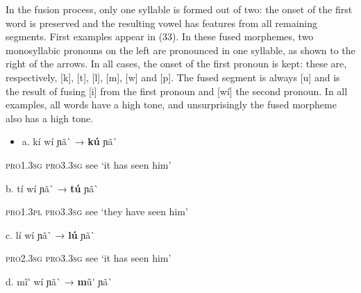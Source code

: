 In the fusion process, only one syllable is formed out of two: the onset of the first word is preserved and the resulting vowel has features from all remaining segments. First examples appear in (33). In these fused morphemes, two monosyllabic pronouns on the left are pronounced in one syllable, as shown to the right of the arrows. In all cases, the onset of the first pronoun is kept: these are, respectively, [k], [t], [l], [m], [w] and [p]. The fused segment is always [u] and is the result of fusing [i] from the first pronoun and [wí] the second pronoun. In all examples, all words have a high tone, and unsurprisingly the fused morpheme also has a high tone.

\begin{itemize}
\item \begin{styleindexi}
   \label{bkm:Ref477004422}a.   kí              wí                ɲã\`{}                  →            \textbf{kú}      ɲã\`{}   
\end{styleindexi}\end{itemize}
\begin{styleindexi}
              \textsc{pro1.3sg}     \textsc{pro3.3sg}      see                             ‘it has seen him’    
\end{styleindexi}

\begin{styleindexi}
          b.   tí               wí                ɲã\`{}                →            \textbf{tú}    ɲã\`{}   
\end{styleindexi}

\begin{styleindexi}
              \textsc{pro1.3pl}    \textsc{pro3.3sg}      see                             ‘they have seen him’ 
\end{styleindexi}

\begin{styleindexi}
          c.   lí                wí                ɲã\`{}                 →            \textbf{lú}    ɲã\`{} 
\end{styleindexi}

\begin{styleindexi}
              \textsc{pro2.3sg}    \textsc{pro3.3sg}      see                            ‘it has seen him’
\end{styleindexi}

\begin{styleindexi}
          d.   mĩ\'{}               wí                ɲã\`{}                   →            \textbf{m}ũ\'{}   ɲã\`{}  
\end{styleindexi}

